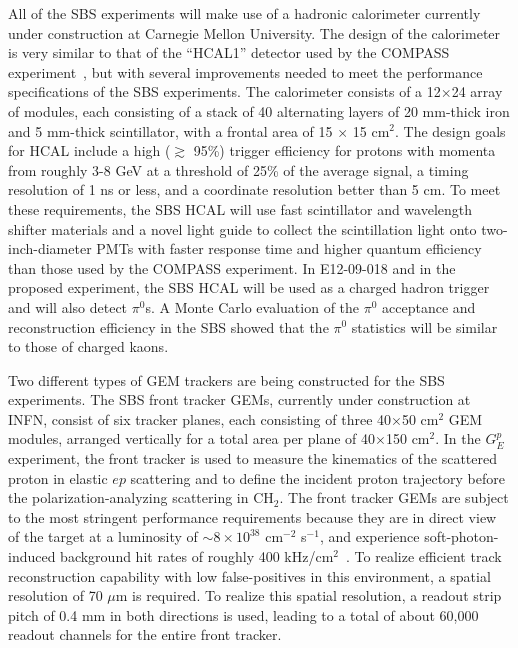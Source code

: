 All of the SBS experiments will make use of a hadronic calorimeter currently under construction at Carnegie Mellon University. The design of the calorimeter is very similar to that of the ``HCAL1'' detector used by the COMPASS experiment~\cite{HCAL1}, but with several improvements needed to meet the performance specifications of the SBS experiments. The calorimeter consists of a 12$\times$24 array of modules, each consisting of a stack of 40 alternating layers of 20 mm-thick iron and 5 mm-thick scintillator, with a frontal area of 15 $\times$ 15 cm$^2$. The design goals for HCAL include a high ($\gtrsim$ 95\%) trigger efficiency for protons with momenta from roughly 3-8 GeV at a threshold of 25\% of the average signal, a timing resolution of 1 ns or less, and a coordinate resolution better than 5 cm. To meet these requirements, the SBS HCAL will use fast scintillator and wavelength shifter materials and a novel light guide to collect the scintillation light onto two-inch-diameter PMTs with faster response time and higher quantum efficiency than those used by the COMPASS experiment. %
In E12-09-018 and in the proposed experiment, the SBS HCAL will be used as a charged hadron trigger and will also detect $\pi^0$s. A Monte Carlo evaluation of the $\pi^0$ acceptance and reconstruction efficiency in the SBS showed that the $\pi^0$ statistics will be similar to those of charged kaons.

Two different types of GEM trackers are being constructed for the SBS experiments. The SBS front tracker GEMs, currently under construction at INFN, consist of six tracker planes, each consisting of three 40$\times$50 cm$^2$ GEM modules, arranged vertically for a total area per plane of 40$\times$150 cm$^2$. In the $G_E^p$ experiment, the front tracker is used to measure the kinematics of the scattered proton in elastic $ep$ scattering and to define the incident proton trajectory before the polarization-analyzing scattering in CH$_2$. The front tracker GEMs are subject to the most stringent performance requirements because they are in direct view of the target at a luminosity of $\sim 8\times 10^{38}$ cm$^{-2}$ s$^{-1}$, and experience soft-photon-induced background hit rates of roughly 400 kHz/cm$^2$~\cite{SBS_CDR_NEW}. To realize efficient track reconstruction capability with low false-positives in this environment, a spatial resolution of 70 $\mu$m is required. To realize this spatial resolution, a readout strip pitch of 0.4 mm in both directions is used, leading to a total of about 60,000 readout channels for the entire front tracker. 

